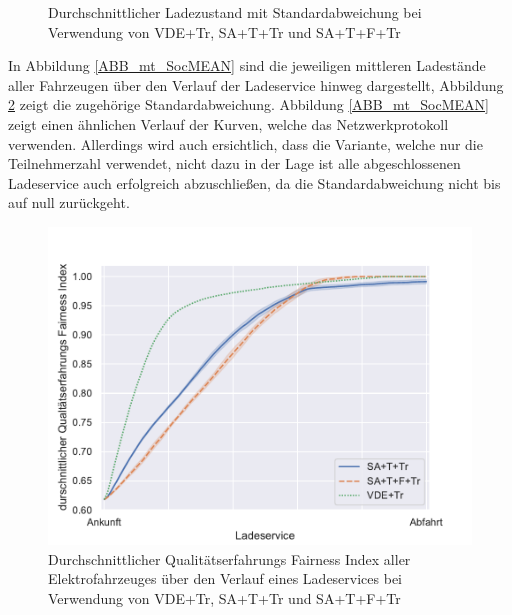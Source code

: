 \begin{figure}
\begin{subfigure}{0.49\linewidth}
        \label{ABB_mT_SocSTD}
	\end{subfigure}
	\caption{Durchschnittlicher Ladezustand mit Standardabweichung bei Verwendung von VDE+Tr, SA+T+Tr und SA+T+F+Tr}
\end{figure}
In Abbildung \ref{ABB_mt_SocMEAN} sind die jeweiligen mittleren Ladestände aller Fahrzeugen über den Verlauf der Ladeservice hinweg dargestellt, Abbildung \ref{ABB_mT_SocSTD} zeigt die zugehörige Standardabweichung. Abbildung \ref{ABB_mt_SocMEAN} zeigt einen ähnlichen Verlauf der Kurven, welche das Netzwerkprotokoll verwenden. Allerdings wird auch ersichtlich, dass die Variante, welche nur die Teilnehmerzahl verwendet, nicht dazu in der Lage ist alle abgeschlossenen Ladeservice auch erfolgreich abzuschließen, da die Standardabweichung nicht bis auf null zurückgeht. 
\begin{figure}[htb]
\centering
	\includegraphics[scale=0.45]{img/mitTrafo/SlottedAloha_participants_VDE_tau_trafo_13_qoe.pdf}
	\caption{Durchschnittlicher Qualitätserfahrungs Fairness Index aller Elektrofahrzeuges über den Verlauf eines Ladeservices bei Verwendung von VDE+Tr, SA+T+Tr und SA+T+F+Tr}
	\label{Abb_mT_Fairness}
\end{figure}
